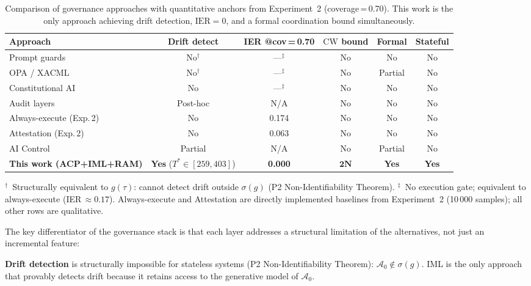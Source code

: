 \documentclass[11pt]{article}
\newcommand{\Azero}{\mathcal{A}_0}
\newcommand{\CW}{\mathrm{CW}}
\newcommand{\IER}{\mathrm{IER}}
\begin{document}
\begin{table}[h]
\centering
\small
\setlength{\tabcolsep}{3.5pt}
\begin{tabular}{@{}lccccc@{}}
\toprule
Approach & Drift detect & IER @cov\,=\,0.70 & $\CW$ bound & Formal & Stateful \\
\midrule
Prompt guards              & No$^\dagger$ & ---$^\ddagger$ & No  & No      & No  \\
OPA / XACML~\cite{openpolicyagent2023} & No$^\dagger$ & ---$^\ddagger$ & No  & Partial & No  \\
Constitutional AI~\cite{bai2022constitutional} & No & ---$^\ddagger$ & No & No & No \\
Audit layers               & Post-hoc      & N/A            & No  & No      & No  \\
Always-execute (Exp.\,2)   & No            & 0.174          & No  & No      & No  \\
Attestation (Exp.\,2)      & No            & 0.063          & No  & No      & No  \\
AI Control~\cite{greenblatt2024ai} & Partial & N/A          & No  & Partial & No  \\
\midrule
\textbf{This work (ACP+IML+RAM)} & \textbf{Yes} ($T^*\!\in\![259,\!403]$) & \textbf{0.000} & $\mathbf{2N}$ & \textbf{Yes} & \textbf{Yes} \\
\bottomrule
\end{tabular}
\smallskip

\begin{minipage}{\linewidth}
\small
$^\dagger$~Structurally equivalent to $g(\tau)$: cannot detect drift outside
$\sigma(g)$ (P2 Non-Identifiability Theorem). $^\ddagger$~No execution gate;
equivalent to always-execute (IER\,$\approx 0.17$).
Always-execute and Attestation are directly implemented baselines from
Experiment~2 (10\,000 samples); all other rows are qualitative.
\end{minipage}
\caption{Comparison of governance approaches with quantitative anchors from
Experiment~2 (coverage\,=\,0.70). This work is the only approach achieving
drift detection, $\IER=0$, and a formal coordination bound simultaneously.}
\label{tab:comparison}
\end{table}

The key differentiator of the governance stack is that each layer addresses
a structural limitation of the alternatives, not just an incremental feature:

\textbf{Drift detection} is structurally impossible for stateless systems
(P2 Non-Identifiability Theorem): $\Azero \notin \sigma(g)$.
IML is the only approach that provably detects drift because it retains
access to the generative model of $\Azero$.
\end{document}
